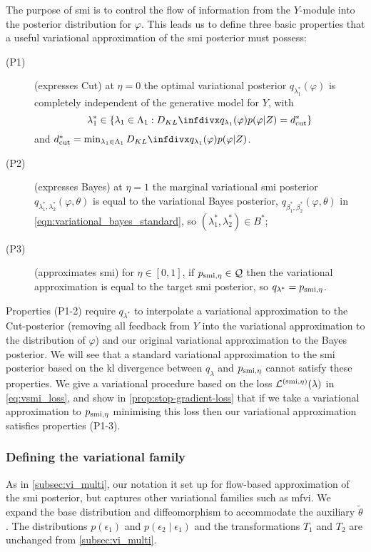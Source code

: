 The purpose of \acrshort*{smi} is to control the flow of information from the $Y$-module into the posterior distribution for $\varphi$.
This leads us to define three basic properties that a useful variational approximation of the \acrshort*{smi} posterior must possess:
\begin{description}
  \item[(P1)] (expresses Cut) at $\eta=0$ the optimal variational posterior $q_{\lambda_1^*}(\varphi)$ is completely independent of the generative model for $Y$,
    with \[\lambda_1^*\in\{\lambda_1\in\Lambda_1: \kl{q_{\lambda_1}(\varphi)}{p(\varphi|Z)}=d^*_{\cut}\}\] and $d^*_{\cut}=\min_{\lambda_1\in\Lambda_1}\kl{q_{\lambda_1}(\varphi)}{p(\varphi|Z)}$.
  \item[(P2)] (expresses Bayes) at $\eta=1$ the marginal variational \acrshort*{smi} posterior $q_{\lambda^*_1,\lambda_2^*}(\varphi,\theta)$ is equal to the variational Bayes posterior, $q_{\beta^*_1,\beta^*_2}(\varphi,\theta)$ in \cref{eqn:variational_bayes_standard}, so $(\lambda_1^*,\lambda^*_2)\in B^*$;
  \item[(P3)] (approximates \acrshort*{smi}) for $\eta\in [0,1]$, if $p_{\operatorname{\text{smi}},\eta}\in\mathcal{Q}$ then the variational approximation is equal to the target \acrshort*{smi} posterior, so $q_{\lambda^*}=p_{\operatorname{\text{smi}},\eta}$.
\end{description}

Properties (P1-2) require $q_{\lambda^*}$ to interpolate a variational approximation to the Cut-posterior (removing all feedback from $Y$ into the variational approximation to the distribution of $\varphi$) and our original variational approximation to the Bayes posterior.
We will see that a standard variational approximation to the \acrshort*{smi} posterior based on the \acrshort*{kl} divergence between $q_\lambda$ and $p_{\operatorname{\text{smi}},\eta}$ cannot satisfy these properties. We give a variational procedure based on the loss $\mathcal{L}^{( \operatorname{\text{smi}}, \eta)}(\lambda)$ in \cref{eq:vsmi_loss}, and show in \cref{prop:stop-gradient-loss} that if we take a variational approximation to $p_{\operatorname{\text{smi}},\eta}$ minimising this loss then our variational approximation satisfies properties (P1-3).

\subsubsection{Defining the variational family}
As in \cref{subsec:vi_multi}, our notation it set up for flow-based approximation of the \acrshort*{smi} posterior, but captures other variational families such as \acrshort*{mfvi}.
We expand the base distribution and diffeomorphism to accommodate the auxiliary $\tilde\theta$.
The distributions $p(\epsilon_1)$ and $p(\epsilon_2 \mid \epsilon_1)$ and the transformations $T_1$ and $T_2$ are unchanged from \cref{subsec:vi_multi}. %

